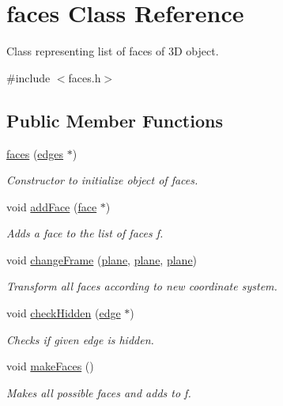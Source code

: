 \hypertarget{classfaces}{}\section{faces Class Reference}
\label{classfaces}


Class representing list of faces of 3D object.  




{\ttfamily \#include $<$faces.\+h$>$}

\subsection*{Public Member Functions}
\begin{DoxyCompactItemize}
\item 
\mbox{\hyperlink{classfaces_a0243aedce9f1e840916474a184c487c9}{faces}} (\mbox{\hyperlink{classedges}{edges}} $\ast$)
\begin{DoxyCompactList}\small\item\em Constructor to initialize object of faces. \end{DoxyCompactList}\item 
void \mbox{\hyperlink{classfaces_acf9ea2364fe3e8886057170f0071663c}{add\+Face}} (\mbox{\hyperlink{structface}{face}} $\ast$)
\begin{DoxyCompactList}\small\item\em Adds a face to the list of faces f. \end{DoxyCompactList}\item 
void \mbox{\hyperlink{classfaces_a538a694eaec8c4d5759b87f688f0405b}{change\+Frame}} (\mbox{\hyperlink{structplane}{plane}}, \mbox{\hyperlink{structplane}{plane}}, \mbox{\hyperlink{structplane}{plane}})
\begin{DoxyCompactList}\small\item\em Transform all faces according to new coordinate system. \end{DoxyCompactList}\item 
void \mbox{\hyperlink{classfaces_a1f56842eabd141ff237689834b3efb8c}{check\+Hidden}} (\mbox{\hyperlink{structedge}{edge}} $\ast$)
\begin{DoxyCompactList}\small\item\em Checks if given edge is hidden. \end{DoxyCompactList}\item 
void \mbox{\hyperlink{classfaces_a71751dbb77129bd08594b2d3d563a7fd}{make\+Faces}} ()
\begin{DoxyCompactList}\small\item\em Makes all possible faces and adds to f. \end{DoxyCompactList}\item 

\end{DoxyCompactItemize}
